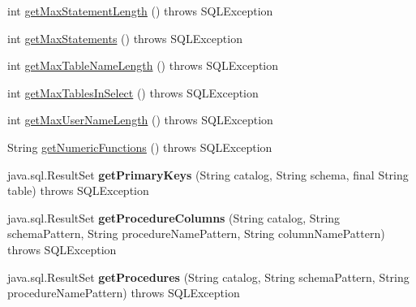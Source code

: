 \begin{DoxyCompactItemize}
\item 
int \mbox{\hyperlink{classcom_1_1mysql_1_1cj_1_1jdbc_1_1_database_meta_data_adf0c116c8183dde21674d747b8315ba6}{get\+Max\+Statement\+Length}} ()  throws S\+Q\+L\+Exception 
\item 
int \mbox{\hyperlink{classcom_1_1mysql_1_1cj_1_1jdbc_1_1_database_meta_data_a576f3289bac06848f324aec66c02da4e}{get\+Max\+Statements}} ()  throws S\+Q\+L\+Exception 
\item 
int \mbox{\hyperlink{classcom_1_1mysql_1_1cj_1_1jdbc_1_1_database_meta_data_af978ccdd2bc8b3ae59560fb7d60c35b8}{get\+Max\+Table\+Name\+Length}} ()  throws S\+Q\+L\+Exception 
\item 
int \mbox{\hyperlink{classcom_1_1mysql_1_1cj_1_1jdbc_1_1_database_meta_data_a5069f21272831c21a1c4fb132193a53d}{get\+Max\+Tables\+In\+Select}} ()  throws S\+Q\+L\+Exception 
\item 
int \mbox{\hyperlink{classcom_1_1mysql_1_1cj_1_1jdbc_1_1_database_meta_data_a1db300512ebbf0e6accd4b4b34aa886f}{get\+Max\+User\+Name\+Length}} ()  throws S\+Q\+L\+Exception 
\item 
String \mbox{\hyperlink{classcom_1_1mysql_1_1cj_1_1jdbc_1_1_database_meta_data_ac051ffbe456985aca58313ed7215b91c}{get\+Numeric\+Functions}} ()  throws S\+Q\+L\+Exception 
\item 
\mbox{\label{classcom_1_1mysql_1_1cj_1_1jdbc_1_1_database_meta_data_a54a97d018612f19a9b905116d7e0459e}} 
java.\+sql.\+Result\+Set {\bfseries get\+Primary\+Keys} (String catalog, String schema, final String table)  throws S\+Q\+L\+Exception 
\item 
\mbox{\label{classcom_1_1mysql_1_1cj_1_1jdbc_1_1_database_meta_data_a29901815ccefc6bb74988a76bb8545f1}} 
java.\+sql.\+Result\+Set {\bfseries get\+Procedure\+Columns} (String catalog, String schema\+Pattern, String procedure\+Name\+Pattern, String column\+Name\+Pattern)  throws S\+Q\+L\+Exception 
\item 
\mbox{\label{classcom_1_1mysql_1_1cj_1_1jdbc_1_1_database_meta_data_a07bb00b813f3d19281a9c680df01566a}} 
java.\+sql.\+Result\+Set {\bfseries get\+Procedures} (String catalog, String schema\+Pattern, String procedure\+Name\+Pattern)  throws S\+Q\+L\+Exception 
\item 

\end{DoxyCompactItemize}
